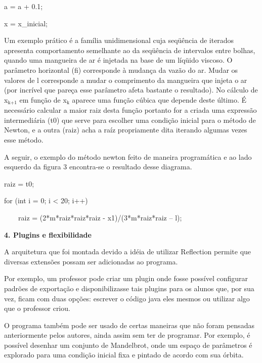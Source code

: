 \documentclass[12pt,twoside]{article}
\newcommand\textsubscript[1]{\ensuremath{{}_{\text{#1}}}}
\begin{document}
{
 a = a + 0.1;}

{
 x = x\_inicial;}

{
 Um exemplo pr\'atico \'e a fam\'ilia unidimensional cuja seq\"u\^encia
de iterados apresenta comportamento semelhante ao da seq\"u\^encia de
intervalos entre bolhas, quando uma mangueira de ar \'e injetada na
base de um l\'iq\"uido viscoso. O par\^ametro
{\textquotedbl}horizontal{\textquotedbl} (fi) corresponde \`a
mudan\c{c}a da vaz\~ao do ar. Mudar os valores de l corresponde a mudar
o comprimento da mangueira que injeta o ar (por incr\'ivel que
pare\c{c}a esse par\^ametro afeta bastante o resultado).\newline
 No c\'alculo de x\textmd{\textsubscript{k+1}} em fun\c{c}\~ao de
x\textsubscript{k} aparece uma fun\c{c}\~ao c\'ubica que depende deste
\'ultimo. \'E necess\'ario calcular a maior raiz desta fun\c{c}\~ao
portanto for a criada uma express\~ao intermedi\'aria (t0) que serve
para escolher uma condi\c{c}\~ao inicial para o m\'etodo de Newton, e a
outra (raiz) acha a ra\'iz propriamente dita iterando algumas vezes
esse m\'etodo.}

{
 A seguir, o exemplo do m\'etodo newton feito de maneira program\'atica
e ao lado esquerdo da figura 3 encontra{}-se o resultado desse
diagrama.}

{
 raiz = t0;}

{
 for (int i = 0; i {\textless} 20; i++)}

{
  \ \ \ \ raiz = (2*m*raiz*raiz*raiz {}- x1)/(3*m*raiz*raiz {--} l);}

{\bfseries
4. Plugins e flexibilidade}

{
A arquitetura que foi montada devido a id\'eia de utilizar Reflection
permite que diversas extens\~oes possam ser adicionadas ao programa.}

{
 Por exemplo, um professor pode criar um plugin onde fosse poss\'ivel
configurar padr\~oes de exporta\c{c}\~ao e disponibilizasse tais
plugins para os alunos que, por sua vez, ficam com duas op\c{c}\~oes:
escrever o c\'odigo java eles mesmos ou utilizar algo que o professor
criou.}

{
 O programa tamb\'em pode ser usado de certas maneiras que n\~ao foram
pensadas anteriormente pelos autores, ainda assim sem ter de programar.
Por exemplo, \'e poss\'ivel desenhar um conjunto de Mandelbrot, onde um
espa\c{c}o de par\^ametros \'e explorado para uma condi\c{c}\~ao
inicial fixa e pintado de acordo com sua \'orbita.}
\end{document}
